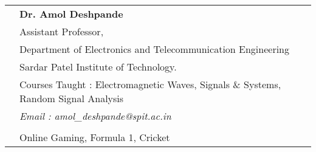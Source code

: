 \documentclass[letterpaper, 10pt]{article}
\begin{document}
\begin{longtable}{p{1.3in}p{4.8in}}
& \textbf{Dr. Amol Deshpande} \\
& Assistant Professor,\\
& Department of Electronics and Telecommunication Engineering \\
& Sardar Patel Institute of Technology. \\
& Courses Taught : Electromagnetic Waves, Signals \& Systems, Random Signal Analysis \\
& \textit{Email : amol\_deshpande@spit.ac.in}\\
& \\



\nohyphens{\color{OliveGreen}{Other interests}} & Online Gaming, Formula 1, Cricket\\


\end{longtable}
\end{document}

